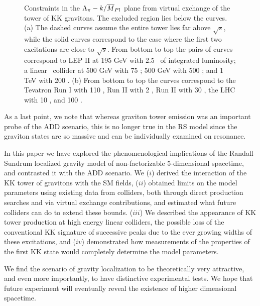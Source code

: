 \nn
\begin{figure}[htbp]
\centerline{
}
\vspace*{0.25cm}
\centerline{
}
\vspace*{0.25cm}
\caption{Constraints in the $\Lambda_\pi-k/\mpl$ plane from virtual exchange
of the tower of KK gravitons.  The excluded region lies below the curves.
(a) The dashed curves assume the entire tower lies far above $\sqrt s$, while
the solid curves correspond to the case where the first two excitations are
close to $\sqrt s$.  From bottom to top the pairs of curves correspond to
LEP II at 195 GeV with 2.5 \infb\ of integrated luminosity; a linear 
\epem\ collider
at 500 GeV with 75 \infb; 500 GeV with 500 \infb; and 1 TeV with 200
\infb.  (b) From bottom to top the curves correspond to the Tevatron
Run I with 110 \inpb, Run II with 2 \infb, 
Run II with 30 \infb, the LHC with 10 \infb,
and 100 \infb.}
\label{cont}
\end{figure}

As a last point, we note that whereas graviton tower emission was an
important probe of the ADD scenario, this is no longer true in the RS
model since the graviton states are so massive and can be individually
examined on resonance.

 In this paper we have explored the phenomenological implications of the 
Randall-Sundrum localized gravity model of non-factorizable 5-dimensional 
spacetime, and contrasted it with the ADD scenario.
We ($i$) derived the interaction of the KK tower of 
gravitons with the SM fields, ($ii$) obtained limits on the model parameters 
using existing data from colliders, both through direct production searches and 
via virtual exchange contributions, and estimated 
what future colliders can do to extend 
these bounds. ($iii$) We described the appearance of KK tower production 
at high energy linear colliders, the possible loss of the conventional 
KK signature of successive peaks due to 
the ever growing widths of these excitations, and ($iv$) demonstrated how 
measurements of the properties of the first KK state would completely determine 
the model parameters. 

We find the scenario of gravity localization 
to be theoretically very attractive, and even more
importantly, to have distinctive experimental tests.  We hope that future
experiment will eventually reveal the existence of higher dimensional
spacetime.


